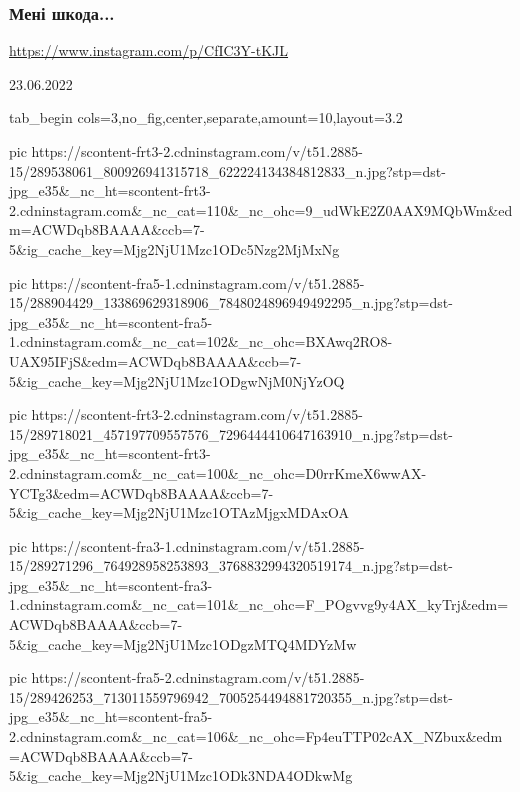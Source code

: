  
 
 
 
 

\subsubsection{Мені шкода...}

\url{https://www.instagram.com/p/CfIC3Y-tKJL}

23.06.2022

\ifcmt
  tab_begin cols=3,no_fig,center,separate,amount=10,layout=3.2

     pic https://scontent-frt3-2.cdninstagram.com/v/t51.2885-15/289538061_800926941315718_622224134384812833_n.jpg?stp=dst-jpg_e35&_nc_ht=scontent-frt3-2.cdninstagram.com&_nc_cat=110&_nc_ohc=9_udWkE2Z0AAX9MQbWm&edm=ACWDqb8BAAAA&ccb=7-5&ig_cache_key=Mjg2NjU1Mzc1ODc5Nzg2MjMxNg%

     pic https://scontent-fra5-1.cdninstagram.com/v/t51.2885-15/288904429_133869629318906_7848024896949492295_n.jpg?stp=dst-jpg_e35&_nc_ht=scontent-fra5-1.cdninstagram.com&_nc_cat=102&_nc_ohc=BXAwq2RO8-UAX95IFjS&edm=ACWDqb8BAAAA&ccb=7-5&ig_cache_key=Mjg2NjU1Mzc1ODgwNjM0NjYzOQ%

     pic https://scontent-frt3-2.cdninstagram.com/v/t51.2885-15/289718021_457197709557576_7296444410647163910_n.jpg?stp=dst-jpg_e35&_nc_ht=scontent-frt3-2.cdninstagram.com&_nc_cat=100&_nc_ohc=D0rrKmeX6wwAX-YCTg3&edm=ACWDqb8BAAAA&ccb=7-5&ig_cache_key=Mjg2NjU1Mzc1OTAzMjgxMDAxOA%

     pic https://scontent-fra3-1.cdninstagram.com/v/t51.2885-15/289271296_764928958253893_3768832994320519174_n.jpg?stp=dst-jpg_e35&_nc_ht=scontent-fra3-1.cdninstagram.com&_nc_cat=101&_nc_ohc=F_POgvvg9y4AX_kyTrj&edm=ACWDqb8BAAAA&ccb=7-5&ig_cache_key=Mjg2NjU1Mzc1ODgzMTQ4MDYzMw%

     pic https://scontent-fra5-2.cdninstagram.com/v/t51.2885-15/289426253_713011559796942_7005254494881720355_n.jpg?stp=dst-jpg_e35&_nc_ht=scontent-fra5-2.cdninstagram.com&_nc_cat=106&_nc_ohc=Fp4euTTP02cAX_NZbux&edm=ACWDqb8BAAAA&ccb=7-5&ig_cache_key=Mjg2NjU1Mzc1ODk3NDA4ODkwMg%

